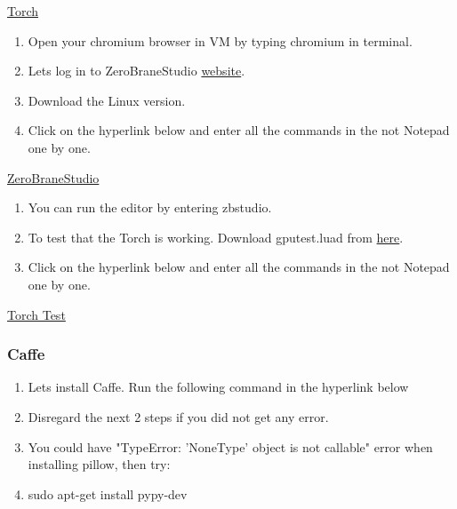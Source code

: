 \documentclass[12pt]{article}
\begin{document}
\begin{center}
\href{run:./Text_Files_14/Torch.txt}{\Large Torch}
\end{center}

\begin{enumerate}[resume]
  \item Open your chromium browser in VM by typing chromium in terminal.
  \item Lets log in to ZeroBraneStudio \href{https://studio.zerobrane.com/download?not-this-time}{website}.
  \item Download the Linux version.	
  \item Click on the hyperlink below and enter all the commands in the not Notepad one by one.
\end{enumerate}

\begin{center}
\href{run:./Text_Files_14/ZeroB.txt}{\Large ZeroBraneStudio}
\end{center}

\begin{enumerate}[resume]
  \item You can run the editor by entering zbstudio.
  \item To test that the Torch is working. Download gputest.luad from \href{https://gist.github.com/jaderberg/6436387}{here}.
  \item Click on the hyperlink below and enter all the commands in the not Notepad one by one.
\end{enumerate}

\begin{center}
\href{run:./Text_Files_14/Torch_test.txt}{\Large Torch Test}
\end{center}


\subsubsection{Caffe}

\begin{enumerate}[resume]
  \item Lets install Caffe. Run the following command in the hyperlink below
  \item Disregard the next 2 steps if you did not get any error.
  \item You could have "TypeError: 'NoneType' object is not callable" error when installing pillow, then try:
  \item sudo apt-get install pypy-dev
\end{enumerate}
\end{document}
